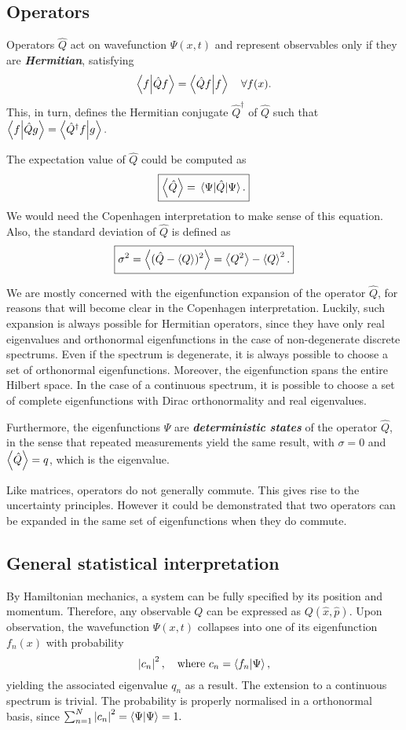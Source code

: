 \documentclass{article}
\theoremstyle{nonumberplain}
\begin{document}
\subsection{Operators}
Operators $\hat{Q}$ act on wavefunction $\Psi (x,t)$ and represent observables only if they are \textit{\textbf{Hermitian}}, satisfying 
\[
    \braket{f}{\hat{Q} f} = \braket{\hat{Q} f}{f} \quad \forall f(x).
\]
This, in turn, defines the Hermitian conjugate $\hat{{Q}}^{\dagger} $ of $\hat{Q} $ such that  
\(
    \braket{f}{\hat{Q} g} = \braket{{\hat{Q} }^{\dagger} f}{g}.
\)

The expectation value of $\hat{Q} $ could be computed as 
\[
    \boxed{
    \expval{\hat{Q} } = \ev{\hat{Q} }{\Psi }.}
\]
We would need the Copenhagen interpretation to make sense of this equation. Also, the standard deviation of $\hat{Q} $ is defined as 
\[
    \boxed{
    \sigma ^{2}  = 
    \expval{(\hat{Q} - \expval{Q})^2} = \expval{Q^2} - \expval{Q}^2 . }
\]

We are mostly concerned with the eigenfunction expansion of the operator $\hat{Q} $, for reasons that will become clear in the Copenhagen interpretation. Luckily, such expansion is always possible for Hermitian operators, since they have only real eigenvalues and orthonormal eigenfunctions in the case of non-degenerate discrete spectrums. Even if the spectrum is degenerate, it is always possible to choose a set of orthonormal eigenfunctions. Moreover, the eigenfunction spans the entire Hilbert space. In the case of a continuous spectrum, it is possible to choose a set of complete eigenfunctions with Dirac orthonormality and real eigenvalues. 

Furthermore, the eigenfunctions $\Psi$ are \textit{\textbf{deterministic states}} of the operator $\hat{Q} $, in the sense that repeated measurements yield the same result, with $\sigma =0$ and $\expval{\hat{Q} } = q$, which is the eigenvalue. 

Like matrices, operators do not generally commute. This gives rise to the uncertainty principles. However it could be demonstrated that two operators can be expanded in the same set of eigenfunctions when they do commute. 

\subsection{General statistical interpretation}
By Hamiltonian mechanics, a system can be fully specified by its position and momentum. Therefore, any observable $Q$ can be expressed as $Q(\hat{x} , \hat{p} )$. Upon observation, the wavefunction $\Psi (x,t)$ collapses into one of its eigenfunction $f_n(x)$ with probability 
\[
    \left\vert c_n \right\vert ^2, \quad
    \text{where } c_n = \braket{f_n}{\Psi },
\]
yielding the associated eigenvalue $q_n$ as a result. The extension to a continuous spectrum is trivial. The probability is properly normalised in a orthonormal basis, since $\sum_{n=1}^{N} \left\vert c_n \right\vert ^2 = \braket{\Psi } = 1. $
\end{document}
